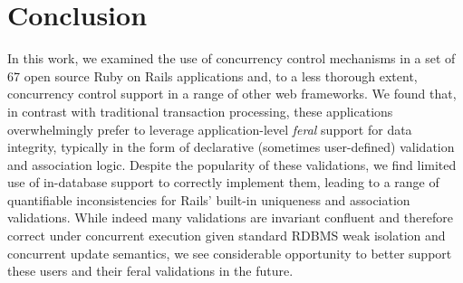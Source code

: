 
\section{Conclusion}
\label{sec:conclusion}

In this work, we examined the use of concurrency control mechanisms in
a set of 67 open source Ruby on Rails applications and, to a less
thorough extent, concurrency control support in a range of other web
frameworks. We found that, in contrast with traditional transaction
processing, these applications overwhelmingly prefer to leverage
application-level \textit{feral} support for data integrity, typically
in the form of declarative (sometimes user-defined) validation and
association logic. Despite the popularity of these validations, we
find limited use of in-database support to correctly implement them,
leading to a range of quantifiable inconsistencies for Rails' built-in
uniqueness and association validations. While indeed many validations
are invariant confluent and therefore correct under concurrent
execution given standard RDBMS weak isolation and concurrent update
semantics, we see considerable opportunity to better support these
users and their feral validations in the future.
